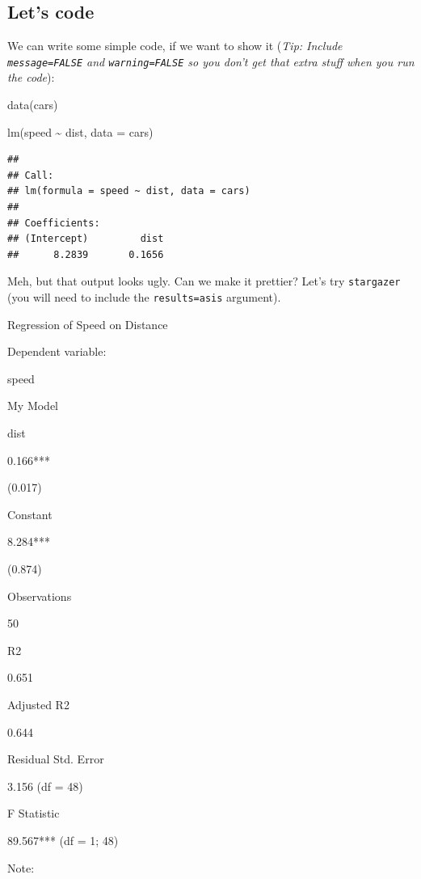 \documentclass[
]{article}
\newenvironment{Shaded}{\begin{snugshade}}{\end{snugshade}}
\newcommand{\AttributeTok}[1]{\textcolor[rgb]{0.77,0.63,0.00}{#1}}
\newcommand{\FunctionTok}[1]{\textcolor[rgb]{0.00,0.00,0.00}{#1}}
\newcommand{\NormalTok}[1]{#1}
\newcommand{\SpecialCharTok}[1]{\textcolor[rgb]{0.00,0.00,0.00}{#1}}
\begin{document}
\hypertarget{lets-code}{%
\subsection{Let's code}\label{lets-code}}

We can write some simple code, if we want to show it (\emph{Tip: Include
\texttt{message=FALSE} and \texttt{warning=FALSE} so you don't get that
extra stuff when you run the code}):

\begin{Shaded}
\begin{Highlighting}[]
\FunctionTok{data}\NormalTok{(cars)}

\FunctionTok{lm}\NormalTok{(speed }\SpecialCharTok{\textasciitilde{}}\NormalTok{ dist, }\AttributeTok{data =}\NormalTok{ cars)}
\end{Highlighting}
\end{Shaded}

\begin{verbatim}
## 
## Call:
## lm(formula = speed ~ dist, data = cars)
## 
## Coefficients:
## (Intercept)         dist  
##      8.2839       0.1656
\end{verbatim}

\newpage

Meh, but that output looks ugly. Can we make it prettier? Let's try
\texttt{stargazer} (you will need to include the
\texttt{results=\textquotesingle{}asis\textquotesingle{}} argument).

Regression of Speed on Distance

Dependent variable:

speed

My Model

dist

0.166***

(0.017)

Constant

8.284***

(0.874)

Observations

50

R2

0.651

Adjusted R2

0.644

Residual Std. Error

3.156 (df = 48)

F Statistic

89.567*** (df = 1; 48)

Note:
\end{document}
